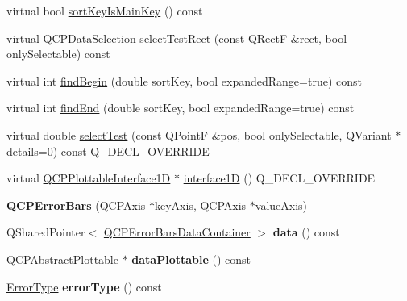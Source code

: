 \begin{DoxyCompactItemize}
\item 
virtual bool \hyperlink{class_q_c_p_error_bars_aa00fcef7b0cb5c54bafe32ab4b16e674}{sort\+Key\+Is\+Main\+Key} () const
\item 
virtual \hyperlink{class_q_c_p_data_selection}{Q\+C\+P\+Data\+Selection} \hyperlink{class_q_c_p_error_bars_ac32f9e729cb205ca56821f9b663472c0}{select\+Test\+Rect} (const Q\+RectF \&rect, bool only\+Selectable) const
\item 
virtual int \hyperlink{class_q_c_p_error_bars_a5c74b510f1d7254263ec18cd3a359a07}{find\+Begin} (double sort\+Key, bool expanded\+Range=true) const
\item 
virtual int \hyperlink{class_q_c_p_error_bars_a64629f13bb290d41dd8f1b37346bfdd4}{find\+End} (double sort\+Key, bool expanded\+Range=true) const
\item 
virtual double \hyperlink{class_q_c_p_error_bars_ac1b6675ef43e32547a3cbcf7b7ac46ed}{select\+Test} (const Q\+PointF \&pos, bool only\+Selectable, Q\+Variant $\ast$details=0) const Q\+\_\+\+D\+E\+C\+L\+\_\+\+O\+V\+E\+R\+R\+I\+DE
\item 
virtual \hyperlink{class_q_c_p_plottable_interface1_d}{Q\+C\+P\+Plottable\+Interface1D} $\ast$ \hyperlink{class_q_c_p_error_bars_a0b6fbf3a943b4241ee485d066cc8562a}{interface1D} () Q\+\_\+\+D\+E\+C\+L\+\_\+\+O\+V\+E\+R\+R\+I\+DE
\item 
\mbox{\label{class_q_c_p_error_bars_a5cdcc33e5f173780c3d657e96216e5c1}} 
{\bfseries Q\+C\+P\+Error\+Bars} (\hyperlink{class_q_c_p_axis}{Q\+C\+P\+Axis} $\ast$key\+Axis, \hyperlink{class_q_c_p_axis}{Q\+C\+P\+Axis} $\ast$value\+Axis)
\item 
\mbox{\label{class_q_c_p_error_bars_aaca5a88227c3aaa44ec1a3612f3115cf}} 
Q\+Shared\+Pointer$<$ \hyperlink{class_q_vector}{Q\+C\+P\+Error\+Bars\+Data\+Container} $>$ {\bfseries data} () const
\item 
\mbox{\label{class_q_c_p_error_bars_ad7e5f1229db58d05bb3d8305d2504af8}} 
\hyperlink{class_q_c_p_abstract_plottable}{Q\+C\+P\+Abstract\+Plottable} $\ast$ {\bfseries data\+Plottable} () const
\item 
\mbox{\label{class_q_c_p_error_bars_a527e7df83c98709cef22a8447fee4f13}} 
\hyperlink{class_q_c_p_error_bars_a95f0220f11a72648b96480a85ce26474}{Error\+Type} {\bfseries error\+Type} () const

\end{DoxyCompactItemize}
